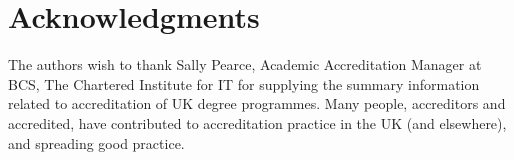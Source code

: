 \documentclass[sigconf]{acmart}
\begin{document}
\section{Acknowledgments}
The authors wish to thank Sally Pearce, Academic Accreditation Manager
at BCS, The Chartered Institute for IT for supplying the summary
information related to accreditation of UK degree programmes. Many
people, accreditors and accredited, have contributed to accreditation
practice in the UK (and elsewhere), and spreading good practice.



\end{document}
